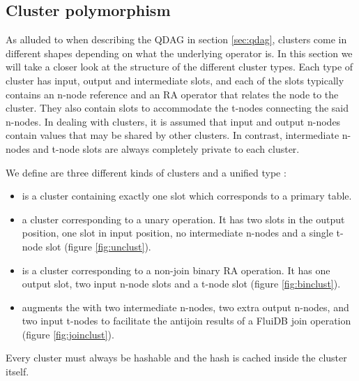\subsection{Cluster polymorphism}
\label{sec:cluster_polymorphism}

As alluded to when describing the QDAG in section \ref{sec:qdag},
clusters come in different shapes depending on what the underlying
operator is. In this section we will take a closer look at the
structure of the different cluster types. Each type of cluster has
input, output and intermediate slots, and each of the slots typically
contains an n-node reference and an RA operator that relates the node
to the cluster. They also contain slots to accommodate the t-nodes
connecting the said n-nodes. In dealing with clusters, it is assumed that
input and output n-nodes contain values that may be shared by other
clusters. In contrast, intermediate n-nodes and t-node slots are
always completely private to each cluster.

We define are three different kinds of clusters and a unified type
:

\begin{itemize}
\item {} is a cluster containing exactly one slot which
  corresponds to a primary table.
\item {} a cluster corresponding to a unary operation. It
  has two slots in the output position, one slot in input position, no
  intermediate n-nodes and a single t-node slot (figure
  \ref{fig:unclust}).
\item {} is a cluster corresponding to a non-join binary
  RA operation. It has one output slot, two input n-node slots and a
  t-node slot (figure \ref{fig:binclust}).
\item {} augments the  with two
  intermediate n-nodes, two extra output n-nodes, and two input
  t-nodes to facilitate the antijoin results of a FluiDB join
  operation (figure \ref{fig:joinclust}).
\end{itemize}

Every cluster must always be hashable and the hash is cached inside
the cluster itself.

